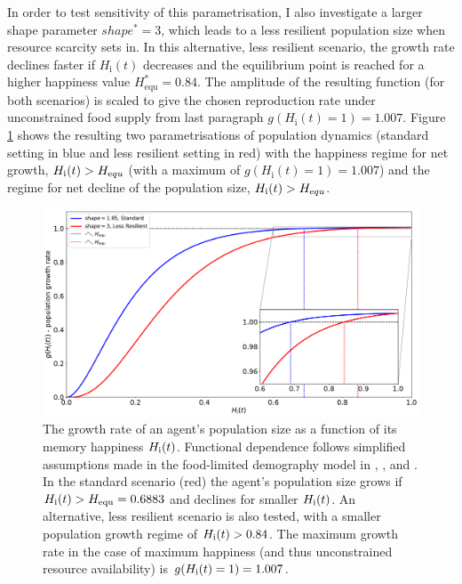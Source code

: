 In order to test sensitivity of this parametrisation, I also investigate a larger shape parameter $shape^*=3$, which leads to a less resilient population size when resource scarcity sets in.
In this alternative, less resilient scenario, the growth rate declines faster if $H_\text{i}(t)$ decreases and the equilibrium point is reached for a higher happiness value $H_\text{equ}^*=0.84$.  %
The amplitude of the resulting function (for both scenarios) is scaled to give the chosen reproduction rate under unconstrained food supply from last paragraph 
$g(H_\text{i}(t)=1)=1.007$.
Figure \ref{fig:growthrate} shows the resulting two parametrisations of population dynamics (standard setting in blue and less resilient setting in red) with the happiness regime for net growth, $H_\text{i}(t) > H_{\text equ}$ (with a maximum of $g(H_\text{i}(t)=1)=1.007$) and the regime for net decline of the population size, $H_\text{i}(t) > H_{\text equ}$.
\begin{figure}
	\centering
	\includegraphics[width=\textwidth]{images/populationchange_g}
	\caption{The growth rate of an agent's population size as a function of its memory happiness $H_{\rm i}(t)$. Functional dependence follows simplified assumptions made in the food-limited demography model in \citet{Lee2008}, \citet{Puleston2008}, and \citet{Puleston2017}. In the standard scenario (red) the agent's population size grows if $H_{\rm i}(t)>H_{\rm equ}=0.6883$ and declines for smaller $H_{\rm i}(t)$. An alternative, less resilient scenario is also tested, with a smaller population growth regime of $H_{\rm i}(t)>0.84$. The maximum growth rate in the case of maximum happiness (and thus unconstrained resource availability) is $g(H_{\rm i}(t)=1)=1.007$.}
	\label{fig:growthrate}
\end{figure}
